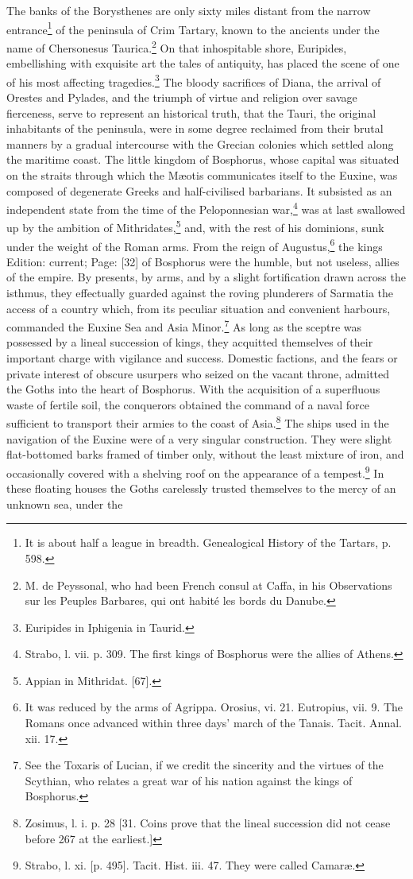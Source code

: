 The banks of the Borysthenes are only sixty miles distant from the narrow entrance\footnote{It is about half a league in breadth. Genealogical History of the Tartars, p. 598.} of the peninsula of Crim Tartary, known to the ancients under the name of Chersonesus Taurica.\footnote{M. de Peyssonal, who had been French consul at Caffa, in his Observations sur les Peuples Barbares, qui ont habité les bords du Danube.} On that inhospitable shore, Euripides, embellishing with exquisite art the tales of antiquity, has placed the scene of one of his most affecting tragedies.\footnote{Euripides in Iphigenia in Taurid.} The bloody sacrifices of Diana, the arrival of Orestes and Pylades, and the triumph of virtue and religion over savage fierceness, serve to represent an historical truth, that the Tauri, the original inhabitants of the peninsula, were in some degree reclaimed from their brutal manners by a gradual intercourse with the Grecian colonies which settled along the maritime coast. The little kingdom of Bosphorus, whose capital was situated on the straits through which the Mæotis communicates itself to the Euxine, was composed of degenerate Greeks and half-civilised barbarians. It subsisted as an independent state from the time of the Peloponnesian war,\footnote{Strabo, l. vii. p. 309. The first kings of Bosphorus were the allies of Athens.} was at last swallowed up by the ambition of Mithridates,\footnote{Appian in Mithridat. [67].} and, with the rest of his dominions, sunk under the weight of the Roman arms. From the reign of Augustus,\footnote{It was reduced by the arms of Agrippa. Orosius, vi. 21. Eutropius, vii. 9. The Romans once advanced within three days\texthebrew{}’ march of the Tanais. Tacit. Annal. xii. 17.} the kings Edition: current; Page: [32] of Bosphorus were the humble, but not useless, allies of the empire. By presents, by arms, and by a slight fortification drawn across the isthmus, they effectually guarded against the roving plunderers of Sarmatia the access of a country which, from its peculiar situation and convenient harbours, commanded the Euxine Sea and Asia Minor.\footnote{See the Toxaris of Lucian, if we credit the sincerity and the virtues of the Scythian, who relates a great war of his nation against the kings of Bosphorus.} As long as the sceptre was possessed by a lineal succession of kings, they acquitted themselves of their important charge with vigilance and success. Domestic factions, and the fears or private interest of obscure usurpers who seized on the vacant throne, admitted the Goths into the heart of Bosphorus. With the acquisition of a superfluous waste of fertile soil, the conquerors obtained the command of a naval force sufficient to transport their armies to the coast of Asia.\footnote{Zosimus, l. i. p. 28 [31. Coins prove that the lineal succession did not cease before 267 at the earliest.]} The ships used in the navigation of the Euxine were of a very singular construction. They were slight flat-bottomed barks framed of timber only, without the least mixture of iron, and occasionally covered with a shelving roof on the appearance of a tempest.\footnote{Strabo, l. xi. [p. 495]. Tacit. Hist. iii. 47. They were called Camaræ.} In these floating houses the Goths carelessly trusted themselves to the mercy of an unknown sea, under the 